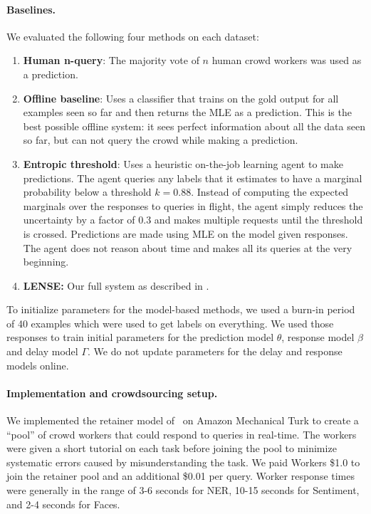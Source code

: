 \paragraph{Baselines.}
We evaluated the following four methods on each dataset:
\begin{enumerate}
  \item {\bf Human n-query}: The majority vote of $n$ human crowd workers was used as a prediction.
  \item {\bf Offline baseline}:
    Uses a classifier that trains on the gold output for all examples seen so far and then returns the MLE as a prediction.
    This is the best possible offline system: it sees perfect information about all the data seen so far, but can not query the crowd while making a prediction.
  \item {\bf Entropic threshold}: Uses a heuristic on-the-job learning agent to make predictions. 
    The agent queries any labels that it estimates to have a marginal probability below a threshold $k = 0.88$. %
    Instead of computing the expected marginals over the responses to queries in flight, the agent simply reduces the uncertainty by a factor of $0.3$ and makes multiple requests until the threshold is crossed. Predictions are made using MLE on the model given responses.
    The agent does not reason about time and makes all its queries at the very beginning.
  \item {\bf LENSE:} Our full system as described in .
\end{enumerate}

To initialize parameters for the model-based methods, we used a burn-in period of 40 examples which were used to get labels on everything. We used those responses to train initial parameters for the prediction model $\theta$, response model $\beta$ and delay model $\Gamma$.
We do not update parameters for the delay and response models online.

\paragraph{Implementation and crowdsourcing setup.}
We implemented the retainer model of~\cite{bernstein2011crowds} on Amazon Mechanical Turk to create a ``pool'' of crowd workers that could respond to queries in real-time.
The workers were given a short tutorial on each task before joining the pool to minimize systematic errors caused by misunderstanding the task.
We paid Workers \$1.0 to join the retainer pool and an additional \$0.01 per query.
Worker response times were generally in the range of 3-6 seconds for NER, 10-15 seconds for Sentiment, and 2-4 seconds for Faces.


